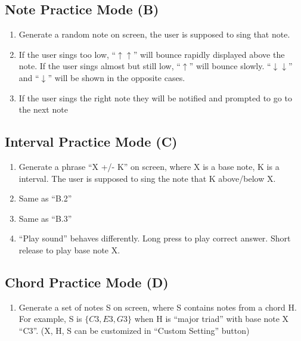 \documentclass{article}
\begin{document}
\subsection{Note Practice Mode (B)}
\begin{enumerate}
  \item Generate a random note on screen, the user is supposed to sing that note. 
  \item If the user sings too low, “$\uparrow\uparrow$” will bounce rapidly displayed above the note. If the user sings almost but still low, “$\uparrow$” will bounce slowly. “$\downarrow\downarrow$” and “$\downarrow$” will be shown in the opposite cases.
  \item If the user sings the right note they will be notified and prompted to go to the next note  

\end{enumerate}

\subsection{Interval Practice Mode (C)}
\begin{enumerate}
  \item Generate a phrase “X +/- K” on screen, where X is a base note, K is a interval. The user is supposed to sing the note that K above/below X.
  \item Same as “B.2”
  \item Same as “B.3”
  \item “Play sound” behaves differently. Long press to play correct answer. Short release to play base note X.

\end{enumerate}

\subsection{Chord Practice Mode (D) }
\begin{enumerate}
  \item Generate a set of notes S on screen, where S contains notes from a chord H. For example, S is $\{C3, E3, G3\}$ when H is “major triad” with base note X “C3”.  (X,  H, S can be customized in “Custom Setting” button)
\end{enumerate}
\end{document}
